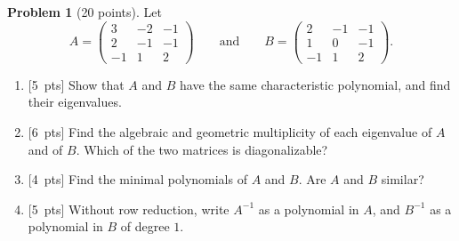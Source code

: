 \documentclass[11pt]{article}
\theoremstyle{definition}
\newtheorem{problem}{Problem}
\newcommand{\pts}[1]{\textup{[#1~pts]}}
\begin{document}
\begin{problem}[20 points]\label{pr:mid-eigen}
    Let
    \[A = \begin{pmatrix} 3 & -2 & -1 \\ 2 & -1 & -1 \\ -1 & 1 & 2 \end{pmatrix} \qquad \text{and} \qquad B = \begin{pmatrix} 2 & -1 & -1 \\ 1 & 0 & -1 \\ -1 & 1 & 2 \end{pmatrix}.\]
    \begin{enumerate}[label=(\alph*)]
        \item \pts{5} Show that $A$ and $B$ have the same characteristic polynomial, and find their eigenvalues.
        \item \pts{6} Find the algebraic and geometric multiplicity of each eigenvalue of $A$ and of $B$. Which of the two matrices is diagonalizable?
        \item \pts{4} Find the minimal polynomials of $A$ and $B$. Are $A$ and $B$ similar?
        \item \pts{5} Without row reduction, write $A^{-1}$ as a polynomial in $A$, and $B^{-1}$ as a polynomial in $B$ of degree $1$.
    \end{enumerate}
\end{problem}
\end{document}
